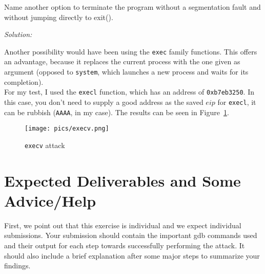 \documentclass[a4paper,11pt]{article}
\newenvironment{solution}%
{\par{\noindent\small\textit{Solution:}}\vspace{-12pt}\begin{framed}}%
{\end{framed}\par}
\begin{document}
\noindent
Name another option to terminate the program without a segmentation fault and
without jumping directly to exit().  
\ifsolution\begin{solution}
Another possibility would have been using the \texttt{exec} family functions. This
offers an advantage, because it replaces the current process with the one given as argument
(opposed to \texttt{system}, which launches a new process and waits for its completion).\\
For my test, I used the \texttt{execl} function, which has an address of \texttt{0xb7eb3250}.
In this case, you don't need to supply a good address as the saved $eip$ for \texttt{execl},
it can be rubbish (\texttt{AAAA}, in my case). The results can be seen in Figure~\ref{fig:execv}.

\end{solution}\fi

\begin{figure}[H] \center
  \texttt{[image: pics/execv.png]}
  \caption{\texttt{execv} attack}
  \label{fig:execv}
\end{figure}

\section*{Expected Deliverables and Some Advice/Help}

First, we point out that this exercise is individual and we expect individual
submissions. Your submission should contain the important gdb commands used and
their output for each step towards successfully performing the attack. It should
also include a brief explanation after some major steps to summarize your
findings.
\end{document}
